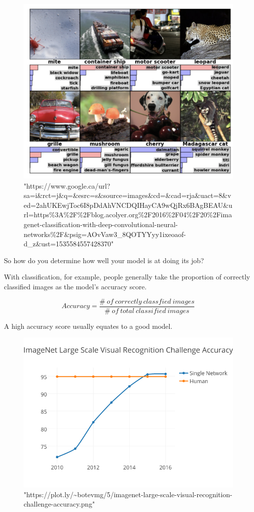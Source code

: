 \documentclass[11pt]{article}
\makeatletter
\def\maxwidth{\ifdim\Gin@nat@width>\linewidth\linewidth
    \else\Gin@nat@width\fi}
\let\Oldincludegraphics\includegraphics
\renewcommand{\includegraphics}[1]{\Oldincludegraphics[width=.8\maxwidth]{#1}}
\makeatother
\begin{document}
\begin{figure}
\centering
\includegraphics{../data/img/imagenet_example.png}
\caption{"https://www.google.ca/url?sa=i\&rct=j\&q=\&esrc=s\&source=images\&cd=\&cad=rja\&uact=8\&ved=2ahUKEwjToc6I8pDdAhVNCDQIHayCA9wQjRx6BAgBEAU\&url=https\%3A\%2F\%2Fblog.acolyer.org\%2F2016\%2F04\%2F20\%2Fimagenet-classification-with-deep-convolutional-neural-networks\%2F\&psig=AOvVaw3\_8QOTYYyy1ixeoaof-d\_z\&ust=1535584557428370"}
\end{figure}

So how do you determine how well your model is at doing its job?

With classification, for example, people generally take the proportion
of correctly classified images as the model's accuracy score.

\[Accuracy = \frac{\#\ of\ correctly\ classfied\ images}{\#\ of\ total\ classified\ images}\]

A high accuracy score usually equates to a good model.

\begin{figure}
\centering
\includegraphics{../data/img/imagenet_scores.png}
\caption{"https://plot.ly/\textasciitilde{}botevmg/5/imagenet-large-scale-visual-recognition-challenge-accuracy.png"}
\end{figure}
\end{document}
